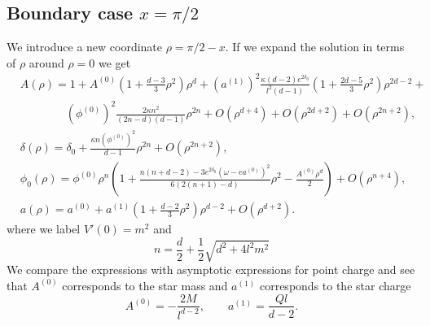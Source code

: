 \documentclass[a4paper,12pt]{article}
\begin{document}
\subsection{Boundary case $x = \pi/2$}
We introduce a new coordinate $\rho = \pi/2 - x$. If we expand the solution in terms of $\rho$ around $\rho = 0$ we get
\begin{subequations}
\begin{align}
	&A(\rho) = 1 + A^{(0)}\left(1 + \frac{d-3}{3}\rho^2\right) \rho^d + (a^{(1)})^2\frac{\kappa (d-2) e^{2\delta_0}}{l^2 (d-1)}\left(1 + \frac{2d-5}{3}\rho^2\right) \rho^{2d-2} + \\\nonumber
	&\qquad\qquad (\phi^{(0)})^2 \frac{2\kappa n^2}{(2n - d)(d-1)} \rho^{2n} + O(\rho^{d+4}) + O(\rho^{2d+2}) + O(\rho^{2n+2}),\\
	&\delta(\rho) = \delta_0 + \frac{\kappa n(\phi^{(0)})^2}{d-1} \rho^{2n} + O(\rho^{2n+2}),\\
	&\phi_0(\rho) = \phi^{(0)} \rho^{n} \left(1 + \frac{n(n + d - 2) - 3e^{2\delta_0}(\omega - e a^{(0)})^2}{6(2(n+1) - d)} \rho^2 - \frac{A^{(0)}\rho^d}{2}\right) + O(\rho^{n+4}),\\
	&a(\rho) = a^{(0)} + a^{(1)}\left(1 + \frac{d-2}{3}\rho^2\right)\rho^{d-2} + O(\rho^{d+2}).
\end{align}
\end{subequations}
where we label $V'(0) = m^2$ and
\begin{equation}
	n = \frac{d}{2} + \frac{1}{2}\sqrt{d^2 + 4 l^2 m^2}
\end{equation}
We compare the expressions with asymptotic expressions for point charge and see that $A^{(0)}$ corresponds to the star mass and $a^{(1)}$ corresponds to the star charge
\begin{equation}
	A^{(0)} = - \frac{2 M}{l^{d-2}},\qquad a^{(1)} =\frac{Q l}{d-2}.
\end{equation}
\end{document}
